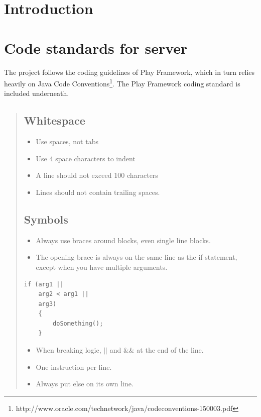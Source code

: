 \documentclass[11pt]{book}
\begin{document}
\section{Introduction}

\section{Code standards for server}\label{sec:codeStandard}
The project follows the coding guidelines of Play Framework\cite{playCodingStandard}, which in turn relies heavily on Java Code Conventions\footnote{http://www.oracle.com/technetwork/java/codeconventions-150003.pdf}. The Play Framework coding standard is included underneath.

\begin{quotation}\noindent
\subsection{Whitespace}
\begin{itemize}
    \item Use spaces, not tabs
    \item Use 4 space characters to indent
    \item A line should not exceed 100 characters
    \item Lines should not contain trailing spaces.
\end{itemize}

\subsection{Symbols}
\begin{itemize}
    \item Always use braces around blocks, even single line blocks.
    \item The opening brace is always on the same line as the if statement, except when you have multiple arguments.
\end{itemize}
\lstset{language=Java}
\begin{lstlisting}[frame=single]
if (arg1 ||
    arg2 < arg1 ||
    arg3)
    {
        doSomething();
    }
\end{lstlisting}
\begin{itemize}
    \item When breaking logic, $||$ and \&\& at the end of the line.
    \item One instruction per line.
    \item Always put else on its own line.
\end{itemize}


\end{quotation}
\end{document}
